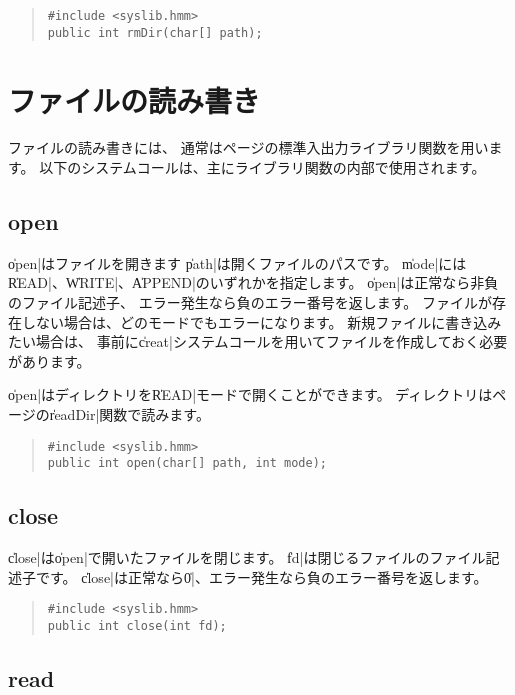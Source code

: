 \begin{quote}
\begin{verbatim}
#include <syslib.hmm>
public int rmDir(char[] path);
\end{verbatim}
\end{quote}

\section{ファイルの読み書き}

ファイルの読み書きには、
通常は\pageref{chap4:stdio}ページの標準入出力ライブラリ関数を用います。
以下のシステムコールは、主にライブラリ関数の内部で使用されます。

\subsection{open}

\|open|はファイルを開きます
\|path|は開くファイルのパスです。
\|mode|には\|READ|、\|WRITE|、\|APPEND|のいずれかを指定します。
\|open|は正常なら非負のファイル記述子、
エラー発生なら負のエラー番号を返します。
ファイルが存在しない場合は、どのモードでもエラーになります。
新規ファイルに書き込みたい場合は、
事前に\|creat|システムコールを用いてファイルを作成しておく必要があります。

\|open|はディレクトリを\|READ|モードで開くことができます。
ディレクトリは\pageref{chap4:readDir}ページの\|readDir|関数で読みます。

\begin{quote}
\begin{verbatim}
#include <syslib.hmm>
public int open(char[] path, int mode);
\end{verbatim}
\end{quote}

\subsection{close}

\|close|は\|open|で開いたファイルを閉じます。
\|fd|は閉じるファイルのファイル記述子です。
\|close|は正常なら\|0|、エラー発生なら負のエラー番号を返します。

\begin{quote}
\begin{verbatim}
#include <syslib.hmm>
public int close(int fd);
\end{verbatim}
\end{quote}

\subsection{read}

